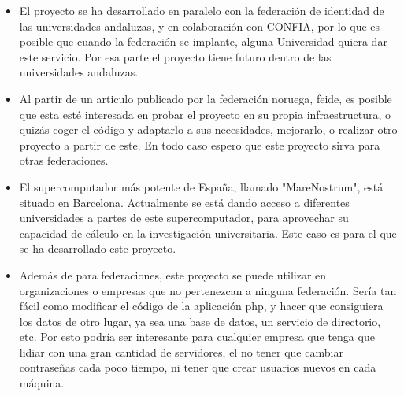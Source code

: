     \begin{itemize}

    \item El proyecto se ha desarrollado en paralelo con la federación de
    identidad de las universidades andaluzas, y en colaboración con CONFIA,
    por lo que es posible que cuando la federación se implante, alguna
    Universidad quiera dar este servicio. Por esa parte el proyecto tiene
    futuro dentro de las universidades andaluzas.

    \item Al partir de un articulo publicado por la federación noruega, feide, es
    posible que esta esté interesada en probar el proyecto en su propia
    infraestructura, o quizás coger el código y adaptarlo a sus
    necesidades, mejorarlo, o realizar otro proyecto a partir de este. En
    todo caso espero que este proyecto sirva para otras federaciones.

    \item El supercomputador más potente de España, llamado "MareNostrum",
    está situado en Barcelona. Actualmente se está dando acceso a
    diferentes universidades a partes de este supercomputador, para
    aprovechar su capacidad de cálculo en la investigación universitaria.
    Este caso es para el que se ha desarrollado este proyecto.

    \item Además de para federaciones, este proyecto se puede utilizar en
    organizaciones o empresas que no pertenezcan a ninguna federación.
    Sería tan fácil como modificar el código de la aplicación php, y hacer
    que consiguiera los datos de otro lugar, ya sea una base de datos, un
    servicio de directorio, etc. Por esto podría ser interesante para
    cualquier empresa que tenga que lidiar con una gran cantidad de
    servidores, el no tener que cambiar contraseñas cada poco tiempo, ni
    tener que crear usuarios nuevos en cada máquina.

    \end{itemize}

